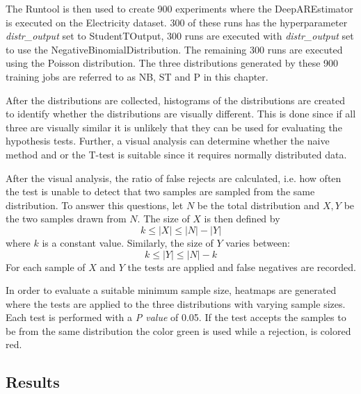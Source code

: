 The Runtool is then used to create 900 experiments where the DeepAREstimator is executed on the Electricity dataset. 300 of these runs has the hyperparameter \textit{distr\_output} set to StudentTOutput, 300 runs are executed with \textit{distr\_output} set to use the NegativeBinomialDistribution. The remaining 300 runs are executed using the Poisson distribution. The three distributions generated by these 900 training jobs are referred to as NB, ST and P in this chapter.

After the distributions are collected, histograms of the distributions are created to identify whether the distributions are visually different. This is done since if all three are visually similar it is unlikely that they can be used for evaluating the hypothesis tests. Further, a visual analysis can determine whether the naive method and or the T-test is suitable since it requires normally distributed data.

After the visual analysis, the ratio of false rejects are calculated, i.e. how often the test is unable to detect that two samples are sampled from the same distribution. To answer this questions, let \(N\) be the total distribution and \(X,Y\) be the two samples drawn from \(N\). The size of \(X\) is then defined by \[k \leq |X| \leq |N| - |Y|\] where \(k\) is a constant value. Similarly, the size of \(Y\) varies between: \[k	\leq |Y| \leq |N|-k\] For each sample of \(X\) and \(Y\) the tests are applied and false negatives are recorded.

In order to evaluate a suitable minimum sample size, heatmaps are generated where the tests are applied to the three distributions with varying sample sizes. Each test is performed with a \textit{P value} of 0.05. If the test accepts the samples to be from the same distribution the color green is used while a rejection, is colored red.

\subsection{Results}

